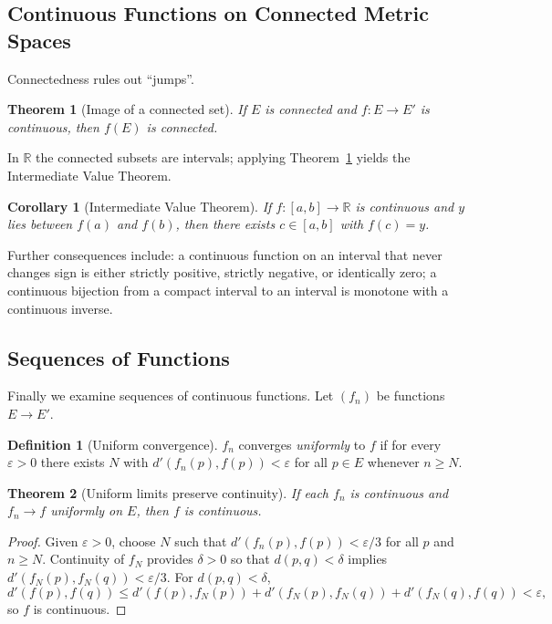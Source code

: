 \documentclass{article}
\theoremstyle{definition}
\newtheorem{definition}{Definition}[section]
\theoremstyle{plain}
\newtheorem{theorem}{Theorem}[section]
\newtheorem{corollary}{Corollary}[theorem]
\begin{document}
\subsection{Continuous Functions on Connected Metric Spaces}\label{subsec:cont-connected}
Connectedness rules out ``jumps''.
\begin{theorem}[Image of a connected set]\label{thm:connected-image}
	If $E$ is connected and $f\colon E\to E'$ is continuous, then $f(E)$ is connected.
\end{theorem}

In $\mathbb{R}$ the connected subsets are intervals; applying Theorem~\ref{thm:connected-image} yields the Intermediate Value Theorem.
\begin{corollary}[Intermediate Value Theorem]\label{cor:ivt}
	If $f\colon [a,b]\to \mathbb{R}$ is continuous and $y$ lies between $f(a)$ and $f(b)$, then there exists $c\in [a,b]$ with $f(c)=y$.
\end{corollary}

Further consequences include: a continuous function on an interval that never changes sign is either strictly positive, strictly negative, or identically zero; a continuous bijection from a compact interval to an interval is monotone with a continuous inverse.

\subsection{Sequences of Functions}\label{subsec:seq-functions}
Finally we examine sequences of continuous functions. Let $(f_n)$ be functions $E\to E'$.
\begin{definition}[Uniform convergence]\label{def:uniform-convergence}
	$f_n$ converges \emph{uniformly} to $f$ if for every $\varepsilon>0$ there exists $N$ with $d'(f_n(p),f(p))<\varepsilon$ for all $p\in E$ whenever $n\ge N$.
\end{definition}

\begin{theorem}[Uniform limits preserve continuity]\label{thm:uniform-limit}
	If each $f_n$ is continuous and $f_n\to f$ uniformly on $E$, then $f$ is continuous.
\end{theorem}
\begin{proof}
	Given $\varepsilon>0$, choose $N$ such that $d'(f_n(p),f(p))<\varepsilon/3$ for all $p$ and $n\ge N$. Continuity of $f_N$ provides $\delta>0$ so that $d(p,q)<\delta$ implies $d'(f_N(p),f_N(q))<\varepsilon/3$. For $d(p,q)<\delta$,
	\[
		d'(f(p),f(q)) \le d'(f(p),f_N(p)) + d'(f_N(p),f_N(q)) + d'(f_N(q),f(q)) < \varepsilon,
	\]
	so $f$ is continuous.
\end{proof}
\end{document}
